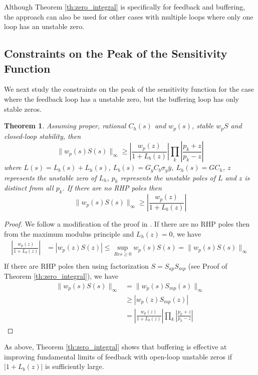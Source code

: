 \documentclass[letterpaper, 10 pt,  conference]{ieeeconf}  %
\newtheorem{theorem}{Theorem}
\begin{document}
Although Theorem \ref{th:zero_integral} is specifically for feedback and buffering, the approach can also be used for other cases with multiple loops where only one loop has an unstable zero.


\subsection{Constraints on the Peak of the Sensitivity Function}

We next study the constraints on the peak of the sensitivity function for the case where the feedback loop has a unstable zero, but the buffering loop has only stable zeros. 

\begin{theorem}\label{th:zero_peak}
Assuming proper, rational $C_h(s)$ and $w_p(s)$, stable $w_pS$ and closed-loop stability, then
\begin{equation}
\|w_p(s)S(s)\|_\infty\ge \left|\frac{w_p(z)}{1+L_b(z)}\right|\prod_k \left|\frac{p_k+z}{p_k-z}\right|
\end{equation}
where $L(s)= L_b(s)+L_h(s)$, $L_b(s)=G_yC_b \sigma_y\bar{y}$, $L_h(s)=GC_h$, $z$ represents the unstable zero of $L_h$, $p_k$ represents the unstable poles of $L$ and $z$ is distinct from all $p_k$. If there are no RHP poles then 
\begin{equation*}
\|w_p(s)S(s)\|_\infty\ge \left|\frac{w_p(z)}{1+L_b(z)}\right|
\end{equation*}
\end{theorem}
\begin{proof}
We follow a modification of the proof in \cite{DOYFT90}. If there are no RHP poles then from the maximum modulus principle \cite{DOYFT90} and $L_h(z)=0$, we have
\begin{equation*}
\begin{aligned}
\left|\frac{w_p(z)}{1+L_b(z)}\right|&=\left|w_p(z)S(z)\right|\le \sup_{Re s\ge 0} w_p(s)S(s)=\|w_p(s)S(s)\|_\infty\\
\end{aligned}
\end{equation*}
If there are RHP poles then using factorization $S=S_{ap}S_{mp}$ (see Proof of Theorem \ref{th:zero_integral}), we have
\begin{equation*}
\begin{aligned}
\|w_p(s)S(s)\|_\infty&=\|w_p(s)S_{mp}(s)\|_\infty\\
&\ge\left| w_p(z)S_{mp}(z)\right|\\
&=\left|\frac{w_p(z)}{1+L_b(z)}\right|\prod_k \left|\frac{p_k+z}{p_k-z}\right|
\end{aligned}
\end{equation*}
\end{proof}
As above, Theorem \ref{th:zero_integral} shows that buffering is effective at improving fundamental limits of feedback with open-loop unstable zeros if $\left|1+L_b(z)\right|$ is sufficiently large.
\end{document}
